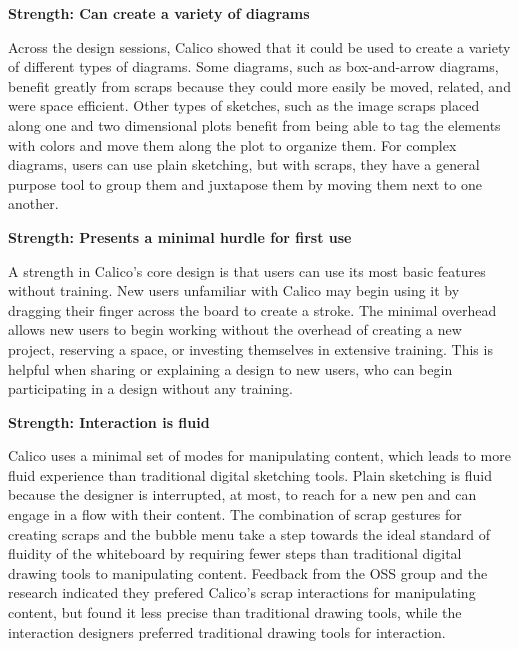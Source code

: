 %

\textbf{Strength: Can create a variety of diagrams}

Across the design sessions, Calico showed that it could be used to create a variety of different types of diagrams. Some diagrams, such as box-and-arrow diagrams, benefit greatly from scraps because they could more easily be moved, related, and were space efficient. Other types of sketches, such as the image scraps placed along one and two dimensional plots benefit from being able to tag the elements with colors and move them along the plot to organize them. For complex diagrams, users can use plain sketching, but with scraps, they have a general purpose tool to group them and juxtapose them by moving them next to one another.



\textbf{Strength: Presents a minimal hurdle for first use}

A strength in Calico's core design is that users can use its most basic features without training. New users unfamiliar with Calico may begin using it by dragging their finger across the board to create a stroke. The minimal overhead allows new users to begin working without the overhead of creating a new project, reserving a space, or investing themselves in extensive training. This is helpful when sharing or explaining a design to new users, who can begin participating in a design without any training. 


\textbf{Strength: Interaction is fluid}

Calico uses a minimal set of modes for manipulating content, which leads to more fluid experience than traditional digital sketching tools. Plain sketching is fluid because the designer is interrupted, at most, to reach for a new pen and can engage in a flow \cite{csikszentmihalyi2009creativity} with their content. The combination of scrap gestures for creating scraps and the bubble menu take a step towards the ideal standard of fluidity of the whiteboard by requiring fewer steps than traditional digital drawing tools to manipulating content. Feedback from the OSS group and the research indicated they prefered Calico's scrap interactions for manipulating content, but found it less precise than traditional drawing tools, while the interaction designers preferred traditional drawing tools for interaction.


